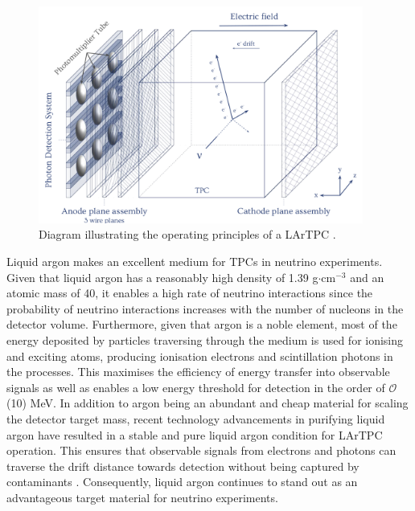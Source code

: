 \begin{figure}[ht!] 
\centering    
\includegraphics[width=0.95\textwidth]{LARTPC}
\caption[LARTPC]{
Diagram illustrating the operating principles of a LArTPC \cite{RhiannonPhD}.
}
\label{fig:LARTPC}
\end{figure}

Liquid argon makes an excellent medium for TPCs in neutrino experiments.
Given that liquid argon has a reasonably high density of 1.39 g$\cdot$cm$^{-3}$ and an atomic mass of 40, it enables a high rate of neutrino interactions since the probability of neutrino interactions increases with the number of nucleons in the detector volume.
Furthermore, given that argon is a noble element, most of the energy deposited by particles traversing through the medium is used for ionising and exciting atoms, producing ionisation electrons and scintillation photons in the processes.
This maximises the efficiency of energy transfer into observable signals as well as enables a low energy threshold for detection in the order of $\mathcal{O}$(10) MeV.
In addition to argon being an abundant and cheap material for scaling the detector target mass, recent technology advancements in purifying liquid argon have resulted in a stable and pure liquid argon condition for LArTPC operation.
This ensures that observable signals from electrons and photons can traverse the drift distance towards detection without being captured by contaminants \cite{ubooneEtime}.
Consequently, liquid argon continues to stand out as an advantageous target material for neutrino experiments. 


